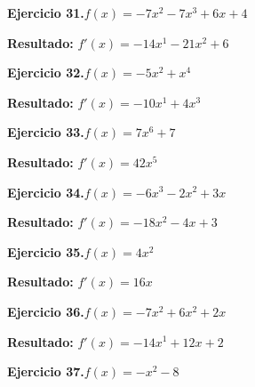 \documentclass[10pt,a4paper]{article}
\begin{document}
\newpage
\begin{ejbox}
\textbf{Ejercicio 31.}\quad $f(x) = -7x^{2} -7x^{3} +6x +4$
\end{ejbox}

\begin{solbox}
\textbf{Resultado:} \(\displaystyle f'(x) = -14x^{1} -21x^{2} +6\)
\end{solbox}

\begin{ejbox}
\textbf{Ejercicio 32.}\quad $f(x) = -5x^{2} + x^{4}$
\end{ejbox}

\begin{solbox}
\textbf{Resultado:} \(\displaystyle f'(x) = -10x^{1} + 4x^{3}\)
\end{solbox}

\begin{ejbox}
\textbf{Ejercicio 33.}\quad $f(x) = 7x^{6} +7$
\end{ejbox}

\begin{solbox}
\textbf{Resultado:} \(\displaystyle f'(x) = 42x^{5}\)
\end{solbox}

\newpage
\begin{ejbox}
\textbf{Ejercicio 34.}\quad $f(x) = -6x^3 -2x^2 +3x$
\end{ejbox}

\begin{solbox}
\textbf{Resultado:} \(\displaystyle f'(x) = -18x^2 -4x +3\)
\end{solbox}

\begin{ejbox}
\textbf{Ejercicio 35.}\quad $f(x) = 4x^{2}$
\end{ejbox}

\begin{solbox}
\textbf{Resultado:} \(\displaystyle f'(x) = 16x\)
\end{solbox}

\begin{ejbox}
\textbf{Ejercicio 36.}\quad $f(x) = -7x^{2} +6x^2 +2x$
\end{ejbox}

\begin{solbox}
\textbf{Resultado:} \(\displaystyle f'(x) = -14x^{1} +12x +2\)
\end{solbox}

\newpage
\begin{ejbox}
\textbf{Ejercicio 37.}\quad $f(x) = -x^{2} -8$
\end{ejbox}
\end{document}
